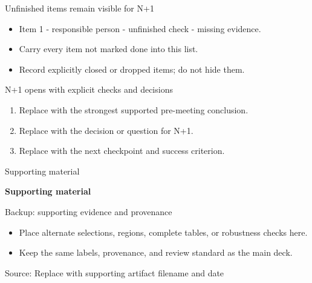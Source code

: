 \documentclass[aspectratio=169,10pt,t]{beamer}
\newcommand{\source}[1]{\par\vfill{\color{slate}\footnotesize Source: #1}\vspace{-0.18cm}}
\begin{document}
\begin{frame}{Unfinished items remain visible for N+1}
  \begin{itemize}
    \item Item 1 - responsible person - unfinished check - missing evidence.
    \item Carry every item not marked done into this list.
    \item Record explicitly closed or dropped items; do not hide them.
  \end{itemize}
\end{frame}

\begin{frame}{N+1 opens with explicit checks and decisions}
  \begin{enumerate}
    \item Replace with the strongest supported pre-meeting conclusion.
    \item Replace with the decision or question for N+1.
    \item Replace with the next checkpoint and success criterion.
  \end{enumerate}
\end{frame}

\appendix

{
\begin{frame}[plain]{Supporting material}
  \centering
  \vfill
  \par
  \vspace{0.40cm}
  {\color{berkeleyblue}\bfseries\fontsize{30}{36}\selectfont Supporting material}\par
  \vspace{0.40cm}
  \vfill
\end{frame}
}

\begin{frame}{Backup: supporting evidence and provenance}
  \begin{itemize}
    \item Place alternate selections, regions, complete tables, or robustness checks here.
    \item Keep the same labels, provenance, and review standard as the main deck.
  \end{itemize}
  \source{Replace with supporting artifact filename and date}
\end{frame}
\end{document}
